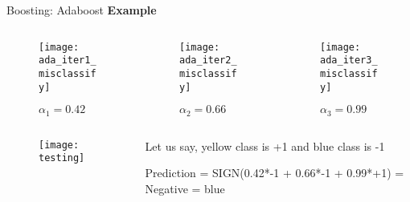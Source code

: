 \documentclass{beamer}
\begin{document}
\begin{frame}{Boosting: Adaboost}
  \textbf{Example}
	\begin{columns}
		\pause 			\begin{column}{0.33\textwidth}
				\centering
				\begin{figure}
					\texttt{[image: ada\_iter1\_misclassify]}
									\vspace{-20pt}
					\caption{$\alpha_1=0.42$}
				\end{figure}
				
			\end{column}
			
			
			\pause \begin{column}{0.4\textwidth}
				\centering
				\begin{figure}
					\texttt{[image: ada\_iter2\_misclassify]}
					\vspace{-20pt}
					\caption{$\alpha_2=0.66$}
				\end{figure}
	
			\pause \end{column}
					\begin{column}{0.3\textwidth}
				\centering
				\begin{figure}
					\texttt{[image: ada\_iter3\_misclassify]}
									\vspace{-20pt}
					\caption{$\alpha_3=0.99$}
				\end{figure}
				
			\end{column}
		\end{columns}
	
		\begin{columns}
			\pause \begin{column}{0.5\textwidth}
				\begin{figure}
				\texttt{[image: testing]}
				\end{figure}
			\end{column}
		
		\begin{column}{0.5\textwidth}
			\pause Let us say, yellow class is +1 and blue class is -1
			
			\pause Prediction = SIGN(0.42*-1 + 0.66*-1 + 0.99*+1) = Negative = blue
		\end{column}
		\end{columns}
	
\end{frame}
\end{document}

